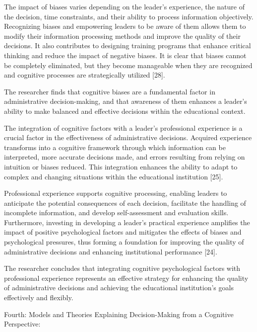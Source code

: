 \documentclass[10pt]{NSP1}
\begin{document}
The impact of biases varies depending on the leader's experience, the nature of the decision, time constraints, and their ability to process information objectively. Recognizing biases and empowering leaders to be aware of them allows them to modify their information processing methods and improve the quality of their decisions. It also contributes to designing training programs that enhance critical thinking and reduce the impact of negative biases. It is clear that biases cannot be completely eliminated, but they become manageable when they are recognized and cognitive processes are strategically utilized [28].

The researcher finds that cognitive biases are a fundamental factor in administrative decision-making, and that awareness of them enhances a leader's ability to make balanced and effective decisions within the educational context.

\par\medskip{}\smallskip

The integration of cognitive factors with a leader's professional experience is a crucial factor in the effectiveness of administrative decisions. Acquired experience transforms into a cognitive framework through which information can be interpreted, more accurate decisions made, and errors resulting from relying on intuition or biases reduced. This integration enhances the ability to adapt to complex and changing situations within the educational institution [25].

Professional experience supports cognitive processing, enabling leaders to anticipate the potential consequences of each decision, facilitate the handling of incomplete information, and develop self-assessment and evaluation skills. Furthermore, investing in developing a leader's practical experience amplifies the impact of positive psychological factors and mitigates the effects of biases and psychological pressures, thus forming a foundation for improving the quality of administrative decisions and enhancing institutional performance [24].

The researcher concludes that integrating cognitive psychological factors with professional experience represents an effective strategy for enhancing the quality of administrative decisions and achieving the educational institution's goals effectively and flexibly.

Fourth: Models and Theories Explaining Decision-Making from a Cognitive Perspective:
\end{document}
